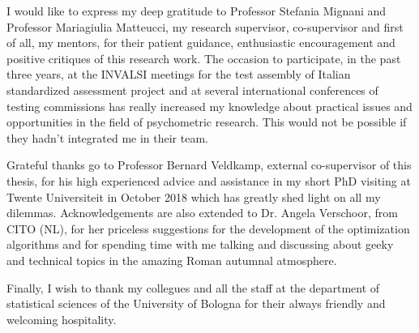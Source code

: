 \documentclass[
12pt, %
english, %
onehalfspacing,%
headsepline, %
]{MastersDoctoralThesis} %
\numberwithin{equation}{chapter} %
\begin{document}
	\begin{acknowledgements}
		\addchaptertocentry{\acknowledgementname} %
		\doublespacing
		I would like to express my deep gratitude to Professor Stefania Mignani and Professor Mariagiulia Matteucci, my research supervisor, co-supervisor and first of all, my mentors, for their patient guidance, enthusiastic encouragement and positive critiques of this research work.
		The occasion to participate, in the past three years, at the INVALSI meetings for the test assembly of Italian standardized assessment project and at several international conferences of testing commissions has really increased my knowledge about practical issues and opportunities in the field of psychometric research. This would not be possible if they hadn't integrated me in their team.
		
		Grateful thanks go to Professor Bernard Veldkamp, external co-supervisor of this thesis, for his high experienced advice and assistance in my short PhD visiting at Twente Universiteit in October 2018 which has greatly shed light on all my dilemmas. Acknowledgements are also extended to Dr. Angela Verschoor, from CITO (NL), for her priceless suggestions for the development of the optimization algorithms and for spending time with me talking and discussing about geeky and technical topics in the amazing Roman autumnal atmosphere. 
		
		Finally, I wish to thank my collegues and all the staff at the department of statistical sciences of the University of Bologna for their always friendly and welcoming hospitality.
	\end{acknowledgements}
	
	
\end{document}
